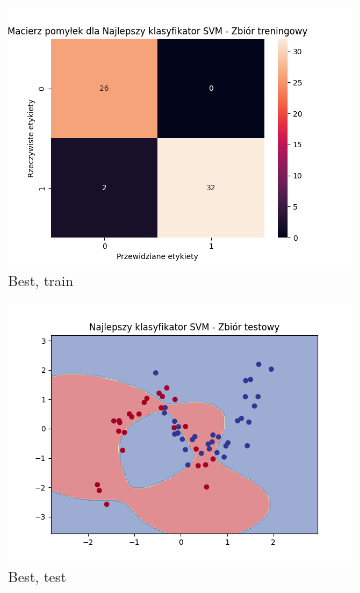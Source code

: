 \documentclass[12pt]{article}
\newcommand*{\subfigwidth}{0.24\textwidth}
\begin{document}
\begin{figure}[H]
\begin{subfigure}[t]{\subfigwidth}
        \includegraphics[width=\linewidth]{img/exp_3/svm/2_3/best/train_matrix.png}
        \caption{Best, train}
    \end{subfigure}
    \hfill
    \begin{subfigure}[t]{\subfigwidth}
        \includegraphics[width=\linewidth]{img/exp_3/svm/2_3/best/test_boundary.png}
        \caption{Best, test}
    \end{subfigure}
    \hfill
    \begin{subfigure}[t]{\subfigwidth}

\end{subfigure}
\end{figure}
\end{document}
